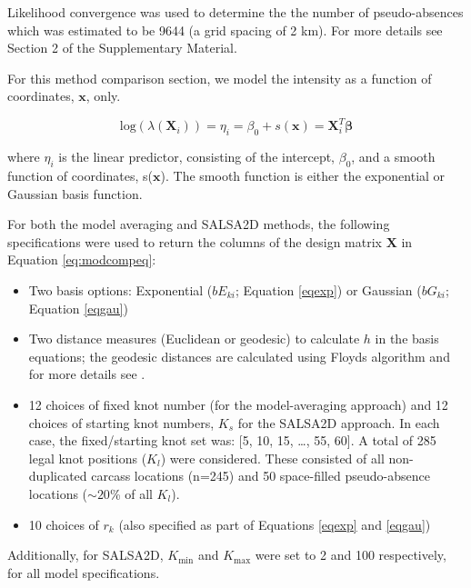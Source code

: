 \documentclass[letterpaper]{interact}
\begin{document}
Likelihood convergence was used to determine the the number of pseudo-absences which was estimated to be 9644 (a grid spacing of 2 km). For more details see Section 2 of the Supplementary Material. 


For this method comparison section, we model the intensity as a function of coordinates, $\mathbf{x}$, only.

\begin{equation}\label{eq:modcompeq}
\textrm{log}(\lambda(\textbf{X}_i)) = \eta_{i} = \beta_0 + s(\mathbf{x})=\boldsymbol{X}_i^T \boldsymbol{\beta}
\end{equation}

where \(\eta_i\) is the linear predictor, consisting of the intercept, \(\beta_0\), and a smooth function of coordinates, s($\mathbf{x}$). The smooth function is either the exponential or Gaussian basis function.

For both the model averaging and SALSA2D methods, the following specifications were used to return the columns of the design matrix \(\boldsymbol{X}\) in Equation \ref{eq:modcompeq}:

\begin{itemize}
\item
  Two basis options: Exponential (\(bE_{ki}\); Equation \ref{eqexp}) or
  Gaussian (\(bG_{ki}\); Equation \ref{eqgau})
\item
  Two distance measures (Euclidean or geodesic) to calculate $h$ in the basis equations; the geodesic distances are calculated using Floyds algorithm \cite{Floyd1962} and for more details see \cite{scott2014}.
\item
  12 choices of fixed knot number (for the model-averaging approach) and 12 choices of starting knot numbers, \(K_s\) for the SALSA2D approach. In each case, the fixed/starting knot set was: {[}5, 10, 15, \dots, 55, 60{]}. A total of 285 legal knot positions ($K_l$) were considered. These consisted of all non-duplicated carcass locations (n=245) and 50 space-filled pseudo-absence locations ($\sim20$\% of all $K_l$).
\item
  10 choices of \(r_k\) (also specified as part of Equations \ref{eqexp}
  and \ref{eqgau})
\end{itemize}

Additionally, for SALSA2D, \(K_\textrm{min}\) and \(K_\textrm{max}\) were set to 2 and 100 respectively, for all model specifications.
\end{document}
